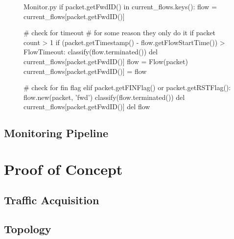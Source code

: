 \begin{figure}
    \begin{code}[colback=white]{Monitor.py}
if packet.getFwdID() in current_flows.keys():
flow = current_flows[packet.getFwdID()]

# check for timeout
# for some reason they only do it if packet count > 1
if (packet.getTimestamp() - flow.getFlowStartTime()) > FlowTimeout:
    classify(flow.terminated())
    del current_flows[packet.getFwdID()]
    flow = Flow(packet)
    current_flows[packet.getFwdID()] = flow

# check for fin flag
elif packet.getFINFlag() or packet.getRSTFlag():
    flow.new(packet, 'fwd')
    classify(flow.terminated())
    del current_flows[packet.getFwdID()]
    del flow
\end{code}
\end{figure}

\textcolor{dimgray}{\lipsum[1]}


\subsection{Monitoring Pipeline}
\label{subsec:monitoring-pipeline}

\textcolor{dimgray}{\lipsum[1]}


\section{Proof of Concept}
\label{sec:poc}

\textcolor{dimgray}{\lipsum[1-10]}


\subsection{Traffic Acquisition}
\label{subsec:traffic-acquisition}

\textcolor{dimgray}{\lipsum}


\subsection{Topology}
\label{subsec:topology}

\textcolor{dimgray}{\lipsum}
